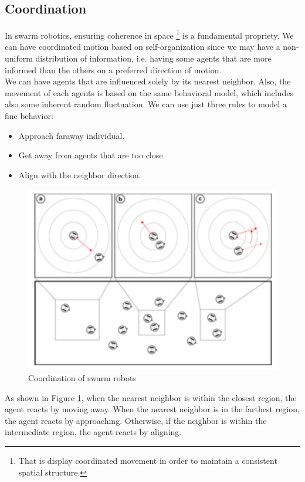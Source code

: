 \documentclass[10pt,a4paper]{article}
\begin{document}
\subsection{Coordination}
In swarm robotics, ensuring coherence in space \footnote{That is display coordinated movement in order to maintain a consistent spatial structure.} is a fundamental propriety. We can have coordinated motion based on self-organization since we may have a non-uniform distribution of information, i.e.  having some agents that are more informed than the others on a preferred direction of motion.\\
We can have agents that are influenced solely by its nearest neighbor. Also, the movement of each agents is based on the same behavioral model, which includes also some inherent random fluctuation. We can use just three rules to model a fine behavior:
\begin{itemize}
\item Approach faraway individual.
\item Get away from agents that are too close.
\item Align with the neighbor direction.
\end{itemize}

\begin{figure}[t]
\centering
\includegraphics[scale=0.8]{images/coordination.png}
\caption{Coordination of swarm robots}
\label{fig:coordination}
\end{figure}

As shown in Figure \ref{fig:coordination}, when the nearest neighbor is within the closest region, the agent reacts by moving away. When the nearest neighbor is in the farthest region, the agent reacts by approaching. Otherwise, if the neighbor is within the intermediate region, the agent reacts by aligning.
\end{document}
